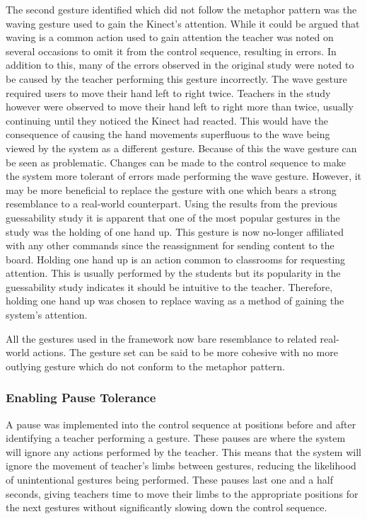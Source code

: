 \documentclass[link]{IWCOMP}
\begin{document}
The second gesture identified which did not follow the metaphor pattern was the waving gesture used to gain the Kinect's attention.
While it could be argued that waving is a common action used to gain attention the teacher was noted on several occasions to omit it from the control sequence, resulting in errors.
In addition to this, many of the errors observed in the original study were noted to be caused by the teacher performing this gesture incorrectly.
The wave gesture required users to move their hand left to right twice.
Teachers in the study however were observed to move their hand left to right more than twice, usually continuing until they noticed the Kinect had reacted.
This would have the consequence of causing the hand movements superfluous to the wave being viewed by the system as a different gesture.
Because of this the wave gesture can be seen as problematic.
Changes can be made to the control sequence to make the system more tolerant of errors made performing the wave gesture.
However, it may be more beneficial to replace the gesture with one which bears a strong resemblance to a real-world counterpart.
Using the results from the previous guessability study it is apparent that one of the most popular gestures in the study was the holding of one hand up.
This gesture is now no-longer affiliated with any other commands since the reassignment for sending content to the board.
Holding one hand up is an action common to classrooms for requesting attention.
This is usually performed by the students but its popularity in the guessability study indicates it should be intuitive to the teacher.
Therefore, holding one hand up was chosen to replace waving as a method of gaining the system's attention.

All the gestures used in the framework now bare resemblance to related real-world actions.
The gesture set can be said to be more cohesive with no more outlying gesture which do not conform to the metaphor pattern.

\subsubsection{Enabling Pause Tolerance}  
\label{subsubsec:studyPhase2ImplementationPauseTolerance}

A pause was implemented into the control sequence at positions before and after identifying a teacher performing a gesture.
These pauses are where the system will ignore any actions performed by the teacher.
This means that the system will ignore the movement of teacher's limbs between gestures, reducing the likelihood of unintentional gestures being performed.
These pauses last one and a half seconds, giving teachers time to move their limbs to the appropriate positions for the next gestures without significantly slowing down the control sequence.
\end{document}
